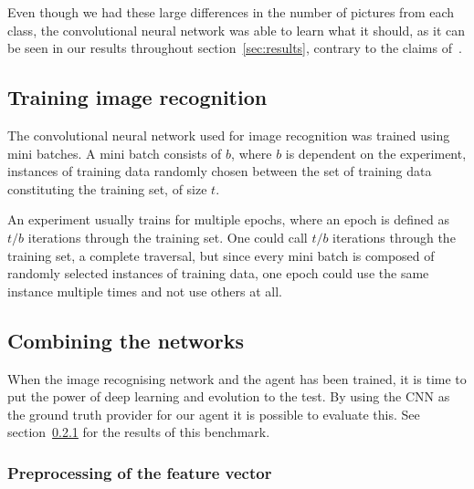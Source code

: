 Even though we had these large differences in the number of pictures from each class, the convolutional neural network was able to learn what it should, as it can be seen in our results throughout section~\ref{sec:results}, contrary to the claims of~\cite{balanced-classes}.

\subsection{Training image recognition}
The convolutional neural network used for image recognition was trained using mini batches. A mini batch consists of $b$, where $b$ is dependent on the experiment, instances of training data randomly chosen between the set of training data constituting the training set, of size $t$.

An experiment usually trains for multiple epochs, where an epoch is defined as $t/b$ iterations through the training set. One could call $t/b$ iterations through the training set, a complete traversal, but since every mini batch is composed of randomly selected instances of training data, one epoch could use the same instance multiple times and not use others at all.

\subsection{Combining the networks}
When the image recognising network and the agent has been trained, it is time to put the power of deep learning and evolution to the test. By using the CNN as the ground truth provider for our agent it is possible to evaluate this. See section~\ref{} for the results of this benchmark.
\subsubsection{Preprocessing of the feature vector}

















































